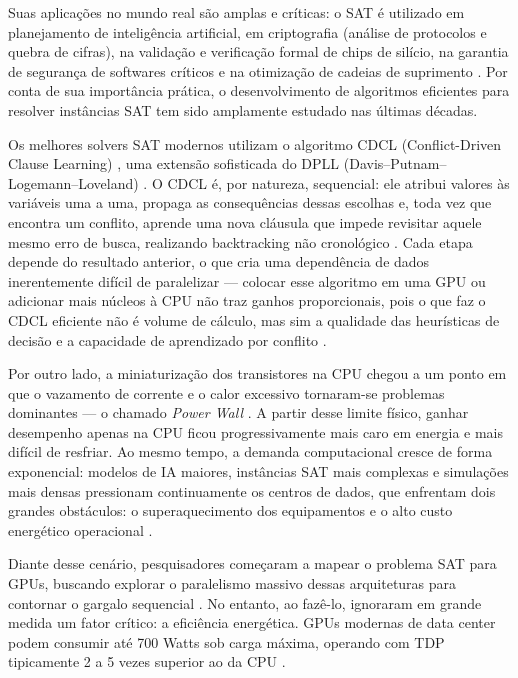 \documentclass[12pt]{article}
\begin{document}
Suas aplicações no mundo real são amplas e críticas: o SAT é utilizado em planejamento de inteligência artificial, em criptografia (análise de protocolos e quebra de cifras), na validação e verificação formal de chips de silício, na garantia de segurança de softwares críticos e na otimização de cadeias de suprimento \cite{biere:2009}. Por conta de sua importância prática, o desenvolvimento de algoritmos eficientes para resolver instâncias SAT tem sido amplamente estudado nas últimas décadas.

Os melhores solvers SAT modernos utilizam o algoritmo CDCL (Conflict-Driven Clause Learning) \cite{moskewicz:2001}, uma extensão sofisticada do DPLL (Davis–Putnam–Logemann–Loveland) \cite{davis:1962}. O CDCL é, por natureza, sequencial: ele atribui valores às variáveis uma a uma, propaga as consequências dessas escolhas e, toda vez que encontra um conflito, aprende uma nova cláusula que impede revisitar aquele mesmo erro de busca, realizando backtracking não cronológico \cite{biere:2009}. Cada etapa depende do resultado anterior, o que cria uma dependência de dados inerentemente difícil de paralelizar — colocar esse algoritmo em uma GPU ou adicionar mais núcleos à CPU não traz ganhos proporcionais, pois o que faz o CDCL eficiente não é volume de cálculo, mas sim a qualidade das heurísticas de decisão e a capacidade de aprendizado por conflito \cite{hennessy:2017}.

Por outro lado, a miniaturização dos transistores na CPU chegou a um ponto em que o vazamento de corrente e o calor excessivo tornaram-se problemas dominantes — o chamado \textit{Power Wall} \cite{hennessy:2017}. A partir desse limite físico, ganhar desempenho apenas na CPU ficou progressivamente mais caro em energia e mais difícil de resfriar. Ao mesmo tempo, a demanda computacional cresce de forma exponencial: modelos de IA maiores, instâncias SAT mais complexas e simulações mais densas pressionam continuamente os centros de dados, que enfrentam dois grandes obstáculos: o superaquecimento dos equipamentos e o alto custo energético operacional \cite{barroso:2018}.

Diante desse cenário, pesquisadores começaram a mapear o problema SAT para GPUs, buscando explorar o paralelismo massivo dessas arquiteturas para contornar o gargalo sequencial \cite{kirk:2016}. No entanto, ao fazê-lo, ignoraram em grande medida um fator crítico: a eficiência energética. GPUs modernas de data center podem consumir até 700 Watts sob carga máxima, operando com TDP tipicamente 2 a 5 vezes superior ao da CPU \cite{mittal:2015}.
\end{document}
